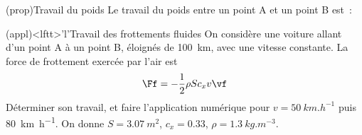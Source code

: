 \documentclass[../../main/main.tex]{subfiles}
\begin{document}
\begin{tcb*}(prop){Travail du poids}
	Le travail du poids entre un point A et un point B est~:
	\psw{
		\[\boxed{W_\ABr(\Pf) = mg(z_\Ar - z_\Br)}\]
	}
	\vspace{-15pt}
\end{tcb*}

\begin{tcb*}(appl)<lftt>'l'{Travail des frottements fluides}
	On considère une voiture allant d'un point A à un point B, éloignés de
	\SI{100}{km}, avec une vitesse constante. La force de frottement exercée par
	l'air est
	\[\Ff = -\frac{1}{2}\rho Sc_xv\vf\]
	Déterminer son travail, et faire l'application
	numérique pour $v = \SI{50}{km.h^{-1}}$ puis \SI{80}{km.h^{-1}}. On donne $S
		= \SI{3.07}{m^2}$, $c_x = \num{0.33}$, $\rho = \SI{1.3}{kg.m^{-3}}$.
	\tcblower
	\begin{minipage}{0.45\linewidth}
		\begin{center}
			\vspace{-15pt}
		\end{center}
	\end{minipage}
	\hfill
	\begin{minipage}{0.45\linewidth}
	\end{minipage}
\end{tcb*}
\end{document}
